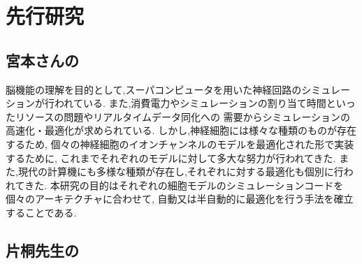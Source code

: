 \section{先行研究}
\subsection{宮本さんの}
脳機能の理解を目的として,スーパコンピュータを用いた神経回路のシミュレーションが行われている.
また,消費電力やシミュレーションの割り当て時間といったリソースの問題やリアルタイムデータ同化への
需要からシミュレーションの高速化・最適化が求められている.
しかし,神経細胞には様々な種類のものが存在するため,
個々の神経細胞のイオンチャンネルのモデルを最適化された形で実装するために,
これまでそれぞれのモデルに対して多大な努力が行われてきた.
また,現代の計算機にも多様な種類が存在し,それぞれに対する最適化も個別に行われてきた.
本研究の目的はそれぞれの細胞モデルのシミュレーションコードを個々のアーキテクチャに合わせて,
自動又は半自動的に最適化を行う手法を確立することである.

\subsection{片桐先生の}
